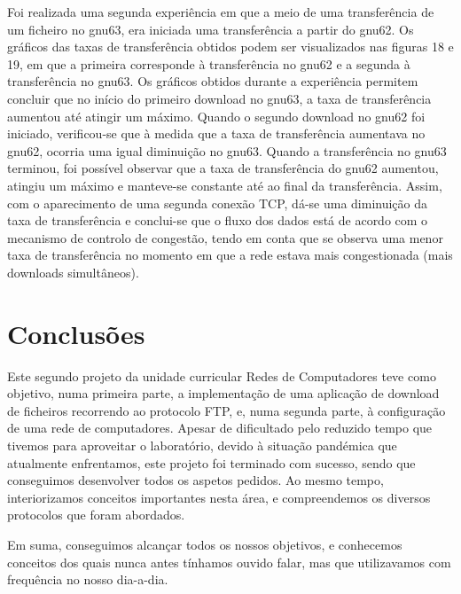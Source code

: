 \documentclass[article, a4paper, 11pt, oneside]{memoir}
\begin{document}
Foi realizada uma segunda experiência em que a meio de uma transferência de um ficheiro no gnu63, era iniciada uma transferência a partir do gnu62. Os gráficos das taxas de transferência
obtidos podem ser visualizados nas figuras 18 e 19, em que a primeira corresponde à transferência no gnu62 e a segunda à transferência no gnu63.
Os gráficos obtidos durante a experiência permitem concluir que no início do primeiro download no gnu63, a taxa de transferência aumentou até atingir um máximo. 
Quando o segundo download no gnu62 foi iniciado, verificou-se que à medida que a taxa de transferência aumentava no gnu62, ocorria uma igual diminuição no gnu63. Quando a transferência no gnu63
terminou, foi possível observar que a taxa de transferência do gnu62 aumentou, atingiu um máximo e manteve-se constante até ao final da transferência.
Assim, com o aparecimento de uma segunda conexão TCP, dá-se uma diminuição da taxa de transferência e conclui-se que o fluxo dos dados está de acordo 
com o mecanismo de controlo de congestão, tendo em conta que se observa uma menor taxa de transferência no momento em que a rede estava mais congestionada (mais downloads simultâneos).



\chapter[Conclusões][Conclusões]{Conclusões} \label{\thechapter}

Este segundo projeto da unidade curricular Redes de Computadores teve como objetivo, numa primeira parte, a implementação de uma aplicação de download de ficheiros recorrendo ao protocolo FTP,
e, numa segunda parte, à configuração de uma rede de computadores. Apesar de dificultado pelo reduzido tempo que tivemos para aproveitar o laboratório, devido à situação pandémica que atualmente enfrentamos,
este projeto foi terminado com sucesso, sendo que conseguimos desenvolver todos os aspetos pedidos.
Ao mesmo tempo, interiorizamos conceitos importantes nesta área, e compreendemos os diversos protocolos que foram abordados.

Em suma, conseguimos alcançar todos os nossos objetivos, e conhecemos conceitos dos quais nunca antes tínhamos ouvido falar, mas que utilizavamos com frequência no nosso dia-a-dia.
\end{document}
